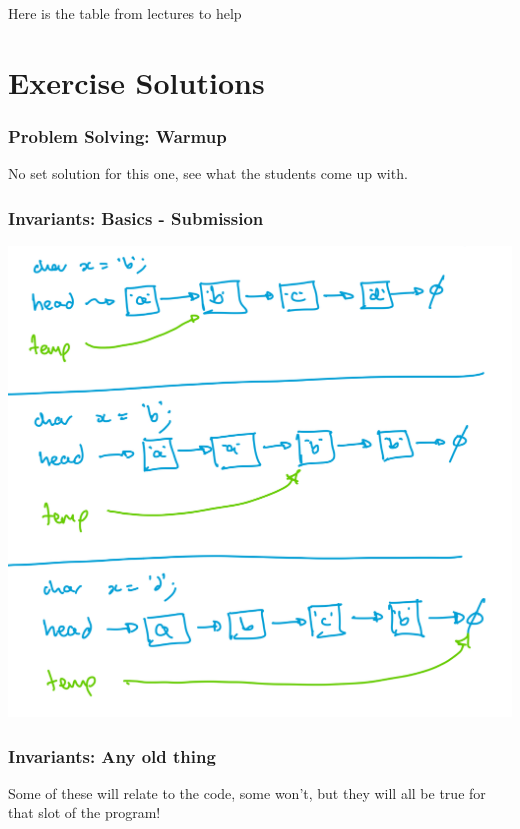 \documentclass[twoside=false,DIV=14]{scrartcl}
\begin{document}
\begin{hint}
Here is the table from lectures to help


\end{hint}


       

\newpage\setcounter{section}{0}
\part*{Exercise Solutions}
\section{Problem Solving: Warmup}

No set solution for this one, see what the students come up with.

\section{Invariants: Basics - Submission}

\includegraphics[width=\textwidth]{./week3_soln1.jpeg}

\section{Invariants: Any old thing}
Some of these will relate to the code, some won't, but they will all be true for that slot of the program!
\end{document}
